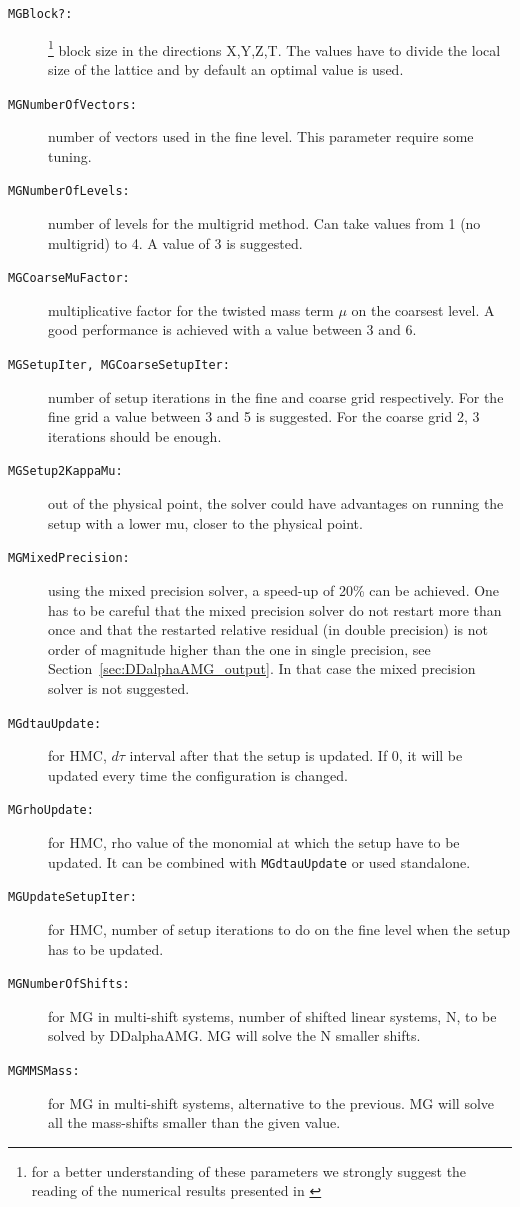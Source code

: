 \begin{description}
	\item[\texttt{MGBlock?:}]\footnote{\label{fn:Alexandrou:2016} for a better understanding of these parameters we strongly suggest the reading of the numerical results presented in \cite{Alexandrou:2016}} block size in the directions X,Y,Z,T. The values have to divide the local size of the lattice and by default an optimal value is used.
	\item[\texttt{MGNumberOfVectors:}] number of vectors used in the fine level. This parameter require some tuning.
	\item[\texttt{MGNumberOfLevels:}] number of levels for the multigrid method. Can take values from 1 (no multigrid) to 4. A value of 3 is suggested.
	\item[\texttt{MGCoarseMuFactor:}] multiplicative factor for the twisted mass term $\mu$ on the coarsest level. A good performance is achieved with a value between 3 and 6.
	\item[\texttt{MGSetupIter, MGCoarseSetupIter:}] number of setup iterations in the fine and coarse grid respectively. For the fine grid a value between 3 and 5 is suggested. For the coarse grid 2, 3 iterations should be enough. 
	\item[\texttt{MGSetup2KappaMu:}] out of the physical point, the
          solver could have advantages on running the setup with a
          lower mu, closer to the physical point.
	\item[\texttt{MGMixedPrecision:}] using the mixed precision solver,
          a speed-up of 20\% can be achieved. One has to be careful
          that the mixed precision solver do not restart more than
          once and that the restarted relative residual (in double
          precision) is not order of magnitude higher than the one in single
          precision, see Section~\ref{sec:DDalphaAMG_output}. In that
          case the mixed precision solver is not suggested.
	\item[\texttt{MGdtauUpdate:}] for HMC, $d\tau$ interval after that the setup is updated. If 0, it will be updated every time the configuration is changed.
	\item[\texttt{MGrhoUpdate:}] for HMC, rho value of the monomial at which the setup have to be updated. It can be combined with \texttt{MGdtauUpdate} or used standalone.
	\item[\texttt{MGUpdateSetupIter:}] for HMC, number of setup iterations to do on the fine level when the setup has to be updated.
	\item[\texttt{MGNumberOfShifts:}] for MG in multi-shift systems, number of shifted linear systems, N, to be solved by DDalphaAMG. MG will solve the N smaller shifts.
	\item[\texttt{MGMMSMass:}] for MG in multi-shift systems, alternative to the previous. MG will solve all the mass-shifts smaller than the given value.
\end{description}

